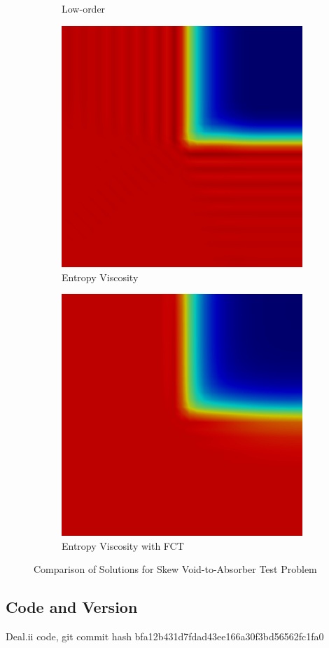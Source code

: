 \begin{figure}[h]
\begin{subfigure}{0.3\textwidth}
      \caption{Low-order}
   \end{subfigure}
   \begin{subfigure}{0.3\textwidth}
      \includegraphics[width=\textwidth]{skew_void_to_absorber/EV.png}
      \caption{Entropy Viscosity}
   \end{subfigure}
   \begin{subfigure}{0.3\textwidth}
      \includegraphics[width=\textwidth]{skew_void_to_absorber/EVFCT.png}
      \caption{Entropy Viscosity with FCT}
   \end{subfigure}
   \caption{Comparison of Solutions for Skew Void-to-Absorber Test Problem}
   \label{fig:skew_void_to_absorber_2D}
\end{figure}
\subsection{Code and Version}
Deal.ii code, git commit hash bfa12b431d7fdad43ee166a30f3bd56562fc1fa0
